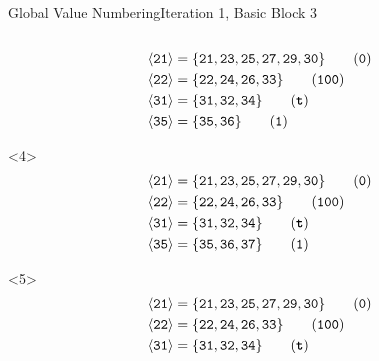 \documentclass{beamer}
\newcommand{\vn}[1]{\ensuremath{\langle\texttt{#1}\rangle}}
\newcommand{\vreg}[1]{\texttt{#1}}
\begin{document}
\begin{frame}[fragile]{Global Value Numbering}{Iteration 1, Basic Block 3}
\begin{columns}[t,onlytextwidth]
\begin{column}{.5\textwidth}
\begin{onlyenv}
        \begin{align*}
          \vn{21} &= \{\vreg{21},
                       \vreg{23},
                       \vreg{25},
                       \vreg{27},
                       \vreg{29},
                       \vreg{30}\} \tag{\texttt{0}} \\
          \vn{22} &= \{\vreg{22},
                       \vreg{24},
                       \vreg{26},
                       \vreg{33}\} \tag{\texttt{100}} \\
          \vn{31} &= \{\vreg{31},
                       \vreg{32},
                       \vreg{34}\} \tag{\texttt{\textbf{t}}} \\
          \vn{35} &= \{\vreg{35},
                       \vreg{36}\} \tag{\texttt{1}}
        \end{align*}
      \end{onlyenv}
      \begin{onlyenv}<4>
        \begin{align*}
          \vn{21} &= \{\vreg{21},
                       \vreg{23},
                       \vreg{25},
                       \vreg{27},
                       \vreg{29},
                       \vreg{30}\} \tag{\texttt{0}} \\
          \vn{22} &= \{\vreg{22},
                       \vreg{24},
                       \vreg{26},
                       \vreg{33}\} \tag{\texttt{100}} \\
          \vn{31} &= \{\vreg{31},
                       \vreg{32},
                       \vreg{34}\} \tag{\texttt{\textbf{t}}} \\
          \vn{35} &= \{\vreg{35},
                       \vreg{36},
                       \vreg{37}\} \tag{\texttt{1}}
        \end{align*}
      \end{onlyenv}
      \begin{onlyenv}<5>
        \begin{align*}
          \vn{21} &= \{\vreg{21},
                       \vreg{23},
                       \vreg{25},
                       \vreg{27},
                       \vreg{29},
                       \vreg{30}\} \tag{\texttt{0}} \\
          \vn{22} &= \{\vreg{22},
                       \vreg{24},
                       \vreg{26},
                       \vreg{33}\} \tag{\texttt{100}} \\
          \vn{31} &= \{\vreg{31},
                       \vreg{32},
                       \vreg{34}\} \tag{\texttt{\textbf{t}}} \\

\end{align*}
\end{onlyenv}
\end{column}
\end{columns}
\end{frame}
\end{document}
